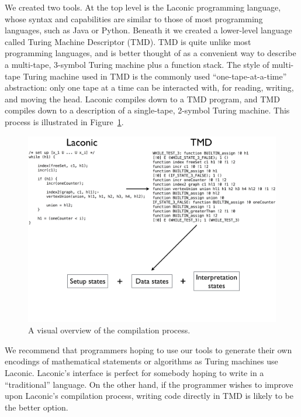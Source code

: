 \documentclass[11pt]{article}
\begin{document}
We created two tools. At the top level is the Laconic programming language, whose syntax and capabilities are similar to those of most programming languages, such as Java or Python. Beneath it we created a lower-level language called Turing Machine Descriptor (TMD). TMD is quite unlike most programming languages, and is better thought of as a convenient way to describe a multi-tape, 3-symbol Turing machine plus a function stack. The style of multi-tape Turing machine used in TMD is the commonly used ``one-tape-at-a-time'' abstraction: only one tape at a time can be interacted with, for reading, writing, and moving the head. Laconic compiles down to a TMD program, and TMD compiles down to a description of a single-tape, 2-symbol Turing machine. This process is illustrated in Figure~\ref{fig:compilation}. 

\begin{figure} 
\begin{center} 
\includegraphics[scale=0.42]{figs/compilation.png}
\caption{A visual overview of the compilation process. \label{fig:compilation}} 
\end{center} 
\end{figure}

We recommend that programmers hoping to use our tools to generate their own encodings of mathematical statements or algorithms as Turing machines use Laconic. Laconic's interface is perfect for somebody hoping to write in a ``traditional'' language. On the other hand, if the programmer wishes to improve upon Laconic's compilation process, writing code directly in TMD is likely to be the better option.
\end{document}
